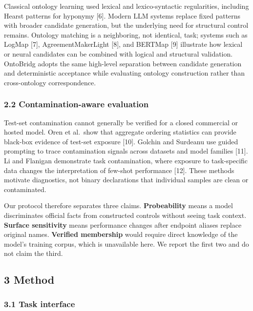 \documentclass[
]{article}
\begin{document}
Classical ontology learning used lexical and lexico-syntactic
regularities, including Hearst patterns for hyponymy {[}6{]}. Modern LLM
systems replace fixed patterns with broader candidate generation, but
the underlying need for structural control remains. Ontology matching is
a neighboring, not identical, task; systems such as LogMap {[}7{]},
AgreementMakerLight {[}8{]}, and BERTMap {[}9{]} illustrate how lexical
or neural candidates can be combined with logical and structural
validation. OntoBridg adopts the same high-level separation between
candidate generation and deterministic acceptance while evaluating
ontology construction rather than cross-ontology correspondence.

\subsubsection{2.2 Contamination-aware
evaluation}\label{contamination-aware-evaluation}

Test-set contamination cannot generally be verified for a closed
commercial or hosted model. Oren et al.~show that aggregate ordering
statistics can provide black-box evidence of test-set exposure {[}10{]}.
Golchin and Surdeanu use guided prompting to trace contamination signals
across datasets and model families {[}11{]}. Li and Flanigan demonstrate
task contamination, where exposure to task-specific data changes the
interpretation of few-shot performance {[}12{]}. These methods motivate
diagnostics, not binary declarations that individual samples are clean
or contaminated.

Our protocol therefore separates three claims. \textbf{Probeability}
means a model discriminates official facts from constructed controls
without seeing task context. \textbf{Surface sensitivity} means
performance changes after endpoint aliases replace original names.
\textbf{Verified membership} would require direct knowledge of the
model's training corpus, which is unavailable here. We report the first
two and do not claim the third.

\subsection{3 Method}\label{method}

\subsubsection{3.1 Task interface}\label{task-interface}
\end{document}

